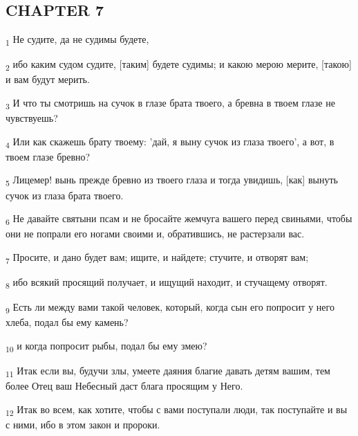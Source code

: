 \subsection{CHAPTER 7}
\begin{tcolorbox}
\textsubscript{1} Не судите, да не судимы будете,
\end{tcolorbox}
\begin{tcolorbox}
\textsubscript{2} ибо каким судом судите, [таким] будете судимы; и какою мерою мерите, [такою] и вам будут мерить.
\end{tcolorbox}
\begin{tcolorbox}
\textsubscript{3} И что ты смотришь на сучок в глазе брата твоего, а бревна в твоем глазе не чувствуешь?
\end{tcolorbox}
\begin{tcolorbox}
\textsubscript{4} Или как скажешь брату твоему: 'дай, я выну сучок из глаза твоего', а вот, в твоем глазе бревно?
\end{tcolorbox}
\begin{tcolorbox}
\textsubscript{5} Лицемер! вынь прежде бревно из твоего глаза и тогда увидишь, [как] вынуть сучок из глаза брата твоего.
\end{tcolorbox}
\begin{tcolorbox}
\textsubscript{6} Не давайте святыни псам и не бросайте жемчуга вашего перед свиньями, чтобы они не попрали его ногами своими и, обратившись, не растерзали вас.
\end{tcolorbox}
\begin{tcolorbox}
\textsubscript{7} Просите, и дано будет вам; ищите, и найдете; стучите, и отворят вам;
\end{tcolorbox}
\begin{tcolorbox}
\textsubscript{8} ибо всякий просящий получает, и ищущий находит, и стучащему отворят.
\end{tcolorbox}
\begin{tcolorbox}
\textsubscript{9} Есть ли между вами такой человек, который, когда сын его попросит у него хлеба, подал бы ему камень?
\end{tcolorbox}
\begin{tcolorbox}
\textsubscript{10} и когда попросит рыбы, подал бы ему змею?
\end{tcolorbox}
\begin{tcolorbox}
\textsubscript{11} Итак если вы, будучи злы, умеете даяния благие давать детям вашим, тем более Отец ваш Небесный даст блага просящим у Него.
\end{tcolorbox}
\begin{tcolorbox}
\textsubscript{12} Итак во всем, как хотите, чтобы с вами поступали люди, так поступайте и вы с ними, ибо в этом закон и пророки.
\end{tcolorbox}

